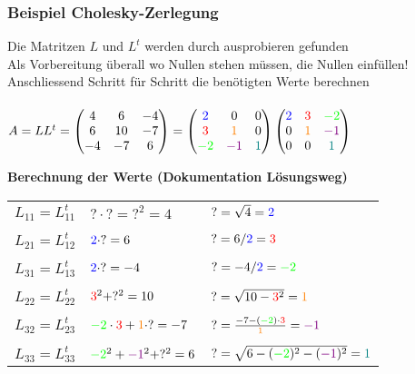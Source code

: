 			\subsubsection{Beispiel Cholesky-Zerlegung}
			Die Matritzen $L$ und $L^t$ werden durch ausprobieren gefunden \\
			Als Vorbereitung überall wo Nullen stehen müssen, die Nullen einfüllen!\\
			Anschliessend Schritt für Schritt die benötigten Werte berechnen\\
			\\
			$A = L L^t = \begin{pmatrix} 4 & 6 & -4 \\ 6 & 10 & -7 \\ -4 & -7 & 6  \end{pmatrix} = \begin{pmatrix} \textcolor{blue}{2} & 0 & 0 \\ \textcolor{red}{3} & \textcolor{orange}{1} & 0 \\ \textcolor{green}{-2} & \textcolor{violet}{-1} & \textcolor{teal}{1}  \end{pmatrix} \begin{pmatrix} \textcolor{blue}{2} & \textcolor{red}{3} & \textcolor{green}{-2} \\ 0 & \textcolor{orange}{1} & \textcolor{violet}{-1} \\ 0 & 0 & \textcolor{teal}{1}  \end{pmatrix} $\\
			
			\vspace{0.2cm}
			
			\textbf{Berechnung der Werte (Dokumentation Lösungsweg)} \\
			
			
			\begin{tabular}{lll}
			$L_{11} = L_{11}^t$ &  $? \cdot ? = ?^2 = 4$ & $? = \sqrt{4} = \textcolor{blue}{2}$ \\ 
			\\
			$L_{21} = L_{12}^t$ & $\textcolor{blue}{2} \cdot ? = 6$ & $? = 6 / \textcolor{blue}{2} = \textcolor{red}{3} $ \\
			\\
			$L_{31} = L_{13}^t$ & $\textcolor{blue}{2} \cdot ? = -4$ & $? = -4 / \textcolor{blue}{2} = \textcolor{green}{-2} $ \\
			\\
			$L_{22} = L_{22}^t$ & $\textcolor{red}{3}^2 + ?^2 = 10$ & $? = \sqrt{10 - \textcolor{red}{3}^2 } = \textcolor{orange}{1}$ \\	
			\\
			$L_{32} = L_{23}^t$ & $ \textcolor{green}{-2} \cdot \textcolor{red}{3} + \textcolor{orange}{1} \cdot ? = -7 $ & $? = \frac{-7 - (\textcolor{green}{-2}) \cdot \textcolor{red}{3}}{\textcolor{orange}{1}} = \textcolor{violet}{-1} $ \\	
			\\
			$L_{33} = L_{33}^t$ &$\textcolor{green}{-2}^2 + \textcolor{violet}{-1}^2 + ?^2 = 6 $ & $ ? = \sqrt{6 - (\textcolor{green}{-2})^2 - (\textcolor{violet}{-1})^2} = \textcolor{teal}{1}$ \\			
			\end{tabular}

